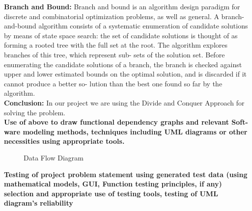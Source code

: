 \documentclass[oneside,a4paper,12pt]{report}
\begin{document}
{\begin{appendices}
\noindent \textbf{ Branch and Bound: } Branch and bound is an algorithm design paradigm for discrete and combinatorial optimization problems, as well as general. A branch-and-bound algorithm consists of a systematic enumeration of candidate solutions by means of state space search: the set of candidate solutions is thought of as forming a rooted tree with the full set at the root. The algorithm explores branches of this tree, which represent sub- sets of the solution set. Before enumerating the candidate solutions of a branch, the branch is checked against upper and lower estimated bounds on the optimal solution, and is discarded if it cannot produce a better so- lution than the best one found so far by the algorithm.\\

\noindent \textbf{ Conclusion: } In our project we are using the Divide and Conquer  Approach for solving the problem. \\

\noindent \textbf{ Use of above to draw functional dependency graphs and relevant Soft- ware modeling methods, techniques including UML diagrams or other necessities using appropriate tools.} \\

\begin{center}
	\begin{figure}[H]
		\centering
	  \caption{Data Flow Diagram}
	  \label{fig:state-dig}
	\end{figure}
\end{center} 


\noindent \textbf{ Testing of project problem statement using generated test data (using mathematical models, GUI, Function testing principles, if any) selection and appropriate use of testing tools, testing of UML diagram’s reliability }


\end{appendices}}
\end{document}
